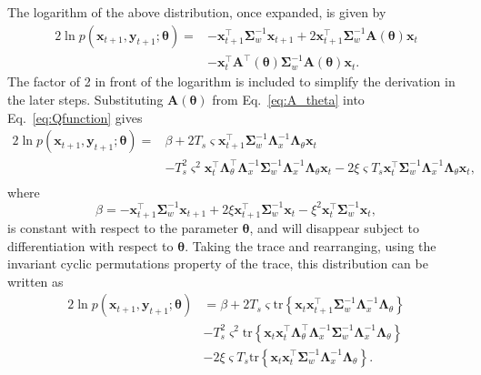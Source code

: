\documentclass[review,authoryear,3p]{elsarticle}
\begin{document}
The logarithm of the above distribution, once expanded, is given by
\begin{align}\label{eq:Qfunction}
2\ln p(\mathbf x_{t+1} , \mathbf y_{t+1};\boldsymbol\theta)=&-\mathbf x_{t+1}^\top\boldsymbol\Sigma_w^{-1}\mathbf x_{t+1}+2\mathbf x_{t+1}^\top\boldsymbol\Sigma_w^{-1}\mathbf A( \boldsymbol\theta)\mathbf x_t\nonumber \\
&-\mathbf x_t^\top\mathbf A^\top(\boldsymbol\theta)\boldsymbol\Sigma_w^{-1}\mathbf A(\boldsymbol\theta)\mathbf x_t.
\end{align}
The factor of 2 in front of the logarithm is included to simplify the derivation in the later steps. Substituting $\mathbf A( \boldsymbol\theta)$ from Eq.~\eqref{eq:A_theta} into Eq.~\eqref{eq:Qfunction} gives
\begin{align}
2\ln p(\mathbf x_{t+1}, \mathbf y_{t+1};\boldsymbol\theta)=&\beta+2 T_s\varsigma\mathbf x_{t+1}^\top\boldsymbol\Sigma_w^{-1}\boldsymbol\Lambda_x^{-1}\boldsymbol\Lambda_{\theta}\mathbf x_t \nonumber \\
&-T_s^2\varsigma^2\mathbf x_t^\top \boldsymbol\Lambda_{\theta}^\top\boldsymbol\Lambda_x^{-1}\boldsymbol\Sigma_w^{-1}\boldsymbol\Lambda_x^{-1}\boldsymbol\Lambda_{\theta}\mathbf x_t-2\xi \varsigma T_s\mathbf x_t^\top\boldsymbol\Sigma_w^{-1}\boldsymbol\Lambda_x^{-1}\boldsymbol\Lambda_{\theta}\mathbf x_t,\nonumber \\
\end{align}
where 
\begin{equation}
\beta=-\mathbf x_{t+1}^\top\boldsymbol\Sigma_w^{-1}\mathbf x_{t+1}+2\xi\mathbf x_{t+1}^\top\boldsymbol\Sigma_w^{-1}\mathbf x_t-\xi^2\mathbf x_t^\top\boldsymbol\Sigma_w^{-1}\mathbf x_t,
\end{equation}
is constant with respect to the parameter $\boldsymbol\theta$, and will disappear subject to differentiation with respect to $\boldsymbol\theta$. Taking the trace and rearranging, using the invariant cyclic permutations property of the trace, this distribution can be written as
\begin{align}\label{eq:Qfunctionintrace}
2\ln p(\mathbf x_{t+1}, \mathbf y_{t+1};\boldsymbol\theta)&=\beta+2 T_s\varsigma\mathrm{tr} \left\lbrace \mathbf x_t\mathbf x_{t+1}^\top\boldsymbol\Sigma_w^{-1}\boldsymbol\Lambda_x^{-1}\boldsymbol\Lambda_{\theta}\right\rbrace \nonumber \\
&-T_s^2\varsigma^2\mathrm{tr} \left\lbrace \mathbf x_t\mathbf x_t^\top \boldsymbol\Lambda_{\theta}^\top\boldsymbol\Lambda_x^{-1}\boldsymbol\Sigma_w^{-1}\boldsymbol\Lambda_x^{-1}\boldsymbol\Lambda_{\theta}\right\rbrace\nonumber \\
&-2\xi\varsigma T_s\mathrm{tr} \left\lbrace \mathbf x_t\mathbf x_{t}^\top\boldsymbol\Sigma_w^{-1}\boldsymbol\Lambda_x^{-1}\boldsymbol\Lambda_{\theta}\right\rbrace.
\end{align}
\end{document}
